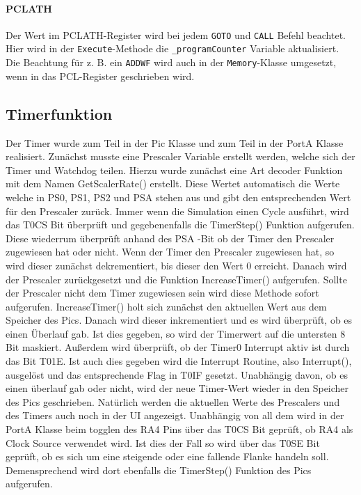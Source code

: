 \paragraph{PCLATH}
Der Wert im PCLATH-Register wird bei jedem \texttt{GOTO} und \texttt{CALL} Befehl beachtet.
Hier wird in der \texttt{Execute}-Methode die \texttt{\_programCounter} Variable aktualisiert.
Die Beachtung für z. B. ein \texttt{ADDWF} wird auch in der \texttt{Memory}-Klasse umgesetzt,
wenn in das PCL-Register geschrieben wird. 


\subsection{Timerfunktion}
Der Timer wurde zum Teil in der Pic Klasse und zum Teil in der PortA Klasse realisiert.  Zunächst musste eine Prescaler Variable erstellt werden, welche sich der Timer und Watchdog teilen. Hierzu wurde zunächst eine Art decoder Funktion mit dem Namen GetScalerRate() erstellt. Diese Wertet automatisch die Werte welche in PS0, PS1, PS2 und PSA stehen aus und gibt den entsprechenden Wert für den Prescaler zurück. Immer wenn die Simulation einen Cycle ausführt, wird das T0CS Bit überprüft und gegebenenfalls die TimerStep() Funktion aufgerufen. Diese wiederrum überprüft anhand des PSA -Bit ob der Timer den Prescaler zugewiesen hat oder nicht. Wenn der Timer den Prescaler zugewiesen hat, so wird dieser zunächst dekrementiert, bis dieser den Wert 0 erreicht. Danach wird der Prescaler zurückgesetzt und die Funktion IncreaseTimer() aufgerufen. Sollte der Prescaler nicht dem Timer zugewiesen sein wird diese Methode sofort aufgerufen. IncreaseTimer() holt sich zunächst den aktuellen Wert aus dem Speicher des Pics. Danach wird dieser inkrementiert und es wird überprüft, ob es einen Überlauf gab. Ist dies gegeben, so wird der Timerwert auf die untersten 8 Bit maskiert. Außerdem wird überprüft, ob der Timer0 Interrupt aktiv ist durch das Bit T01E. Ist auch dies gegeben wird die Interrupt Routine, also Interrupt(), ausgelöst und das entsprechende Flag in T0IF gesetzt. Unabhängig davon, ob es einen überlauf gab oder nicht, wird der neue Timer-Wert wieder in den Speicher des Pics geschrieben. Natürlich werden die aktuellen Werte des Prescalers und des Timers auch noch in der UI angezeigt. Unabhängig von all dem wird in der PortA Klasse beim togglen des RA4 Pins über das T0CS Bit geprüft, ob RA4 als Clock Source verwendet wird. Ist dies der Fall so wird über das T0SE Bit geprüft, ob es sich um eine steigende oder eine fallende Flanke handeln soll. Demensprechend wird dort ebenfalls die TimerStep() Funktion des Pics aufgerufen.


